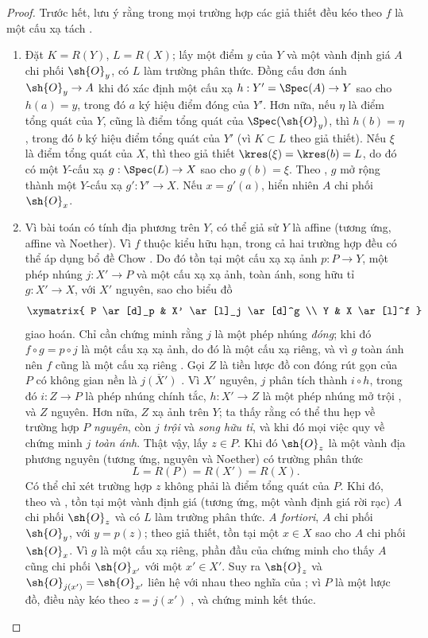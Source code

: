 \begin{proof}
Trước hết, lưu ý rằng trong mọi trường hợp các giả thiết đều kéo theo $f$ là một cấu xạ tách .
\begin{enumerate}
  \item[\rm{(i)}] Đặt $K=R(Y)$, $L=R(X)$; lấy một điểm $y$ của $Y$ và một vành định giá $A$ chi phối $\sh{O}_y$, có $L$ làm trường phân thức.
  Đồng cấu đơn ánh $\sh{O}_y\to A$ khi đó xác định một cấu xạ $h:Y'=\Spec(A)\to Y$  sao cho $h(a)=y$, trong đó $a$ ký hiệu điểm đóng của $Y'$.
  Hơn nữa, nếu $\eta$ là điểm tổng quát của $Y$, cũng là điểm tổng quát của $\Spec(\sh{O}_y)$, thì $h(b)=\eta$, trong đó $b$ ký hiệu điểm tổng quát của $Y'$ (vì $K\subset L$ theo giả thiết).
  Nếu $\xi$ là điểm tổng quát của $X$, thì theo giả thiết $\kres(\xi)=\kres(b)=L$, do đó có một $Y$-cấu xạ $g:\Spec(L)\to X$ sao cho $g(b)=\xi$.
  Theo , $g$ mở rộng thành một $Y$-cấu xạ $g':Y'\to X$.
  Nếu $x=g'(a)$, hiển nhiên $A$ chi phối $\sh{O}_x$.

  \item[\rm{(ii)}] Vì bài toán có tính địa phương trên $Y$, có thể giả sử $Y$ là affine (tương ứng, affine và Noether).
  Vì $f$ thuộc kiểu hữu hạn, trong cả hai trường hợp đều có thể áp dụng bổ đề Chow .
  Do đó tồn tại một cấu xạ xạ ảnh $p:P\to Y$, một phép nhúng $j:X'\to P$ và một cấu xạ xạ ảnh, toàn ánh, song hữu tỉ $g:X'\to X$, với $X'$ nguyên, sao cho biểu đồ
  \[
    \xymatrix{
      P \ar[d]_p
      & X' \ar[l]_j \ar[d]^g
      \\ Y
      & X \ar[l]^f
    }
  \]
  giao hoán.
  Chỉ cần chứng minh rằng $j$ là một phép nhúng \emph{đóng}; khi đó $f\circ g=p\circ j$ là một cấu xạ xạ ảnh, do đó là một cấu xạ riêng, và vì $g$ toàn ánh nên $f$ cũng là một cấu xạ riêng .
  Gọi $Z$ là tiền lược đồ con đóng rút gọn của $P$ có không gian nền là $\overline{j(X')}$ .
  Vì $X'$ nguyên, $j$ phân tích thành $i\circ h$, trong đó $i:Z\to P$ là phép nhúng chính tắc, $h:X'\to Z$ là một phép nhúng mở trội , và $Z$ nguyên.
  Hơn nữa, $Z$ xạ ảnh trên $Y$; ta thấy rằng có thể thu hẹp về trường hợp $P$ \emph{nguyên}, còn $j$ \emph{trội} và \emph{song hữu tỉ}, và khi đó mọi việc quy về chứng minh $j$ \emph{toàn ánh}.
  Thật vậy, lấy $z\in P$.
  Khi đó $\sh{O}_z$ là một vành địa phương nguyên (tương ứng, nguyên và Noether) có trường phân thức
  \[
    L=R(P)=R(X')=R(X).
  \]
  Có thể chỉ xét trường hợp $z$ không phải là điểm tổng quát của $P$.
  Khi đó, theo  và , tồn tại một vành định giá (tương ứng, một vành định giá rời rạc) $A$ chi phối $\sh{O}_z$ và có $L$ làm trường phân thức.
  \emph{A fortiori}, $A$ chi phối $\sh{O}_y$, với $y=p(z)$; theo giả thiết, tồn tại một $x\in X$ sao cho $A$ chi phối $\sh{O}_x$.
  Vì $g$ là một cấu xạ riêng, phần đầu của chứng minh cho thấy $A$ cũng chi phối $\sh{O}_{x'}$ với một $x'\in X'$.
  Suy ra $\sh{O}_z$ và $\sh{O}_{j(x')}=\sh{O}_{x'}$ liên hệ với nhau theo nghĩa của ; vì $P$ là một lược đồ, điều này kéo theo $z=j(x')$ , và chứng minh kết thúc.
\end{enumerate}
\end{proof}
